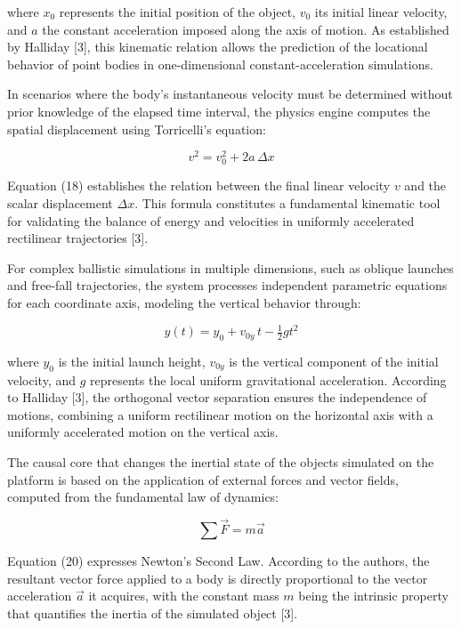 \documentclass[conference,a4paper]{IEEEtran}
\begin{document}
where $x_0$ represents the initial position of the object, $v_0$ its initial linear velocity, and $a$ the constant acceleration imposed along the axis of motion. As established by Halliday [3], this kinematic relation allows the prediction of the locational behavior of point bodies in one-dimensional constant-acceleration simulations.

In scenarios where the body's instantaneous velocity must be determined without prior knowledge of the elapsed time interval, the physics engine computes the spatial displacement using Torricelli's equation:

\begin{equation}
v^2 = v_0^2 + 2a\,\Delta x \tag{18}
\end{equation}

Equation (18) establishes the relation between the final linear velocity $v$ and the scalar displacement $\Delta x$. This formula constitutes a fundamental kinematic tool for validating the balance of energy and velocities in uniformly accelerated rectilinear trajectories [3].

For complex ballistic simulations in multiple dimensions, such as oblique launches and free-fall trajectories, the system processes independent parametric equations for each coordinate axis, modeling the vertical behavior through:

\begin{equation}
y(t) = y_0 + v_{0y}\,t - \tfrac{1}{2}g t^2 \tag{19}
\end{equation}

where $y_0$ is the initial launch height, $v_{0y}$ is the vertical component of the initial velocity, and $g$ represents the local uniform gravitational acceleration. According to Halliday [3], the orthogonal vector separation ensures the independence of motions, combining a uniform rectilinear motion on the horizontal axis with a uniformly accelerated motion on the vertical axis.

The causal core that changes the inertial state of the objects simulated on the platform is based on the application of external forces and vector fields, computed from the fundamental law of dynamics:

\begin{equation}
\sum \vec{F} = m\vec{a} \tag{20}
\end{equation}

Equation (20) expresses Newton's Second Law. According to the authors, the resultant vector force applied to a body is directly proportional to the vector acceleration $\vec{a}$ it acquires, with the constant mass $m$ being the intrinsic property that quantifies the inertia of the simulated object [3].
\end{document}
